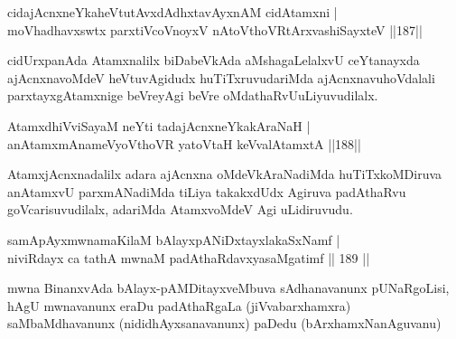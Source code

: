 \begin{shl}
cidajAcnxneYkaheVtutAvxdAdhxtavAyxnAM cidAtamxni |\\
moVhadhavxswtx parxtiVcoV\s noyxV nAtoV\s thoVR\s tArxvashiSayxteV \hfill ||187||
\end{shl}

\begin{artha}
cidUrxpanAda Atamxnalilx biDabeVkAda aMshagaLelalxvU ceYtanayxda ajAcnxnavoMdeV heVtuvAgidudx huTiTxruvudariMda ajAcnxnavu\break hoVdalali parxtayxgAtamxnige beVreyAgi beVre oMdathaRvU\break uLiyuvudilalx.
\end{artha}


\begin{shl}
AtamxdhiVviSayaM neYti tadajAcnxneYkakAraNaH |\\
anAtamxmAnameVyoV\s thoVR yatoV\s taH keVvalAtamxtA \hfill ||188||
\end{shl}

\begin{artha}
AtamxjAcnxnadalilx adara ajAcnxna oMdeVkAraNadiMda huTiTxkoMDiruva anAtamxvU parxmANadiMda tiLiya takakxdUdx Agiruva padAthaRvu goVcarisuvudilalx, adariMda AtamxvoMdeV Agi uLidiruvudu.
\end{artha}





\begin{shl}
samApAyxmwnamaKilaM bAlayxpANiDxtayxlakaSxNamf |\\
niviRdayx ca tathA mwnaM padAthaRdavxyasaMgatimf \hfill || 189 ||
\end{shl}

\begin{artha}%
mwna BinanxvAda bAlayx-pAMDitayxveMbuva sAdhanavanunx pUNaRgoLisi, hAgU mwnavanunx eraDu padAthaRgaLa (jiVvabarxhamxra) saMbaMdhavanunx (nididhAyxsanavanunx) paDedu (bArxhamxNanAguvanu)
\end{artha}


